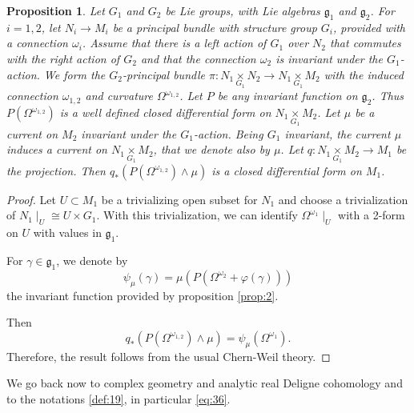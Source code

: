 \documentclass[10pt,twoside]{article}
\numberwithin{equation}{section}
\theoremstyle{plain}
\newtheorem{proposition}[equation]{Proposition}
\theoremstyle{definition}
\begin{document}
\begin{proposition} \label{prop:3}
  Let $G_{1}$ and $G_{2}$ be Lie groups, with Lie algebras
  $\mathfrak{g}_{1}$ and $\mathfrak{g}_{2}$. For $i=1,2$, let
  $N_{i}\longrightarrow 
  M_{i}$ be a principal bundle with structure group $G_{i}$, provided
  with a
  connection $\omega _{i}$. Assume that there is a left action of
  $G_{1}$ over $N_{2}$ that commutes with the right action of $G_{2}$
  and that the connection $\omega _{2}$ is invariant under the
  $G_{1}$-action. We form the $G_{2}$-principal bundle
  $\pi\colon N_{1}\underset{G_{1}}{\times} N_{2}\longrightarrow 
  N_{1}\underset{G_{1}}{\times} M_{2}$ with the induced connection
  $\omega _{1,2}$ and curvature $\Omega ^{\omega _{1,2}}$.  Let $P$ be
  any invariant function on $\mathfrak{g}_{2}$. Thus $P(\Omega
  ^{\omega _{1,2}})$ is a well defined closed differential form on
  $N_{1}\underset{G_{1}}{\times} M_{2}$. Let $\mu $ be a current on
  $M_{2}$ invariant under the $G_{1}$-action. Being $G_{1}$ invariant,
  the
  current $\mu $ 
  induces a current on $N_{1}\underset{G_{1}}{\times} M_{2}$, that we
  denote also by $\mu$. Let $q\colon N_{1}\underset{G_{1}}{\times} M_{2}
  \longrightarrow M_{1}$ be the projection. Then $q_{\ast}(P(\Omega
  ^{\omega _{1,2}})\land \mu)$ is a closed differential form on
  $M_{1}$.
\end{proposition}
\begin{proof}
  Let $U\subset M_{1}$ be a trivializing open subset for $N_{1}$ and
  choose a trivialization of $N_{1}\mid _{U}\cong U\times G_{1}$. With this
  trivialization, we can identify $\Omega ^{\omega _{1}}\mid _{U}$ with a
  2-form on $U$ with values in $\mathfrak{g}_{1}$. 

  For $\gamma \in \mathfrak{g}_{1}$, we denote by 
  \begin{displaymath}
    \psi _{\mu}(\gamma )=\mu (P(\Omega ^{\omega_{2}
}+\varphi(\gamma))) 
  \end{displaymath}
the invariant function provided by proposition \ref{prop:2}. 

Then 
\begin{displaymath}
  q_{\ast}(P(\Omega
  ^{\omega _{1,2}})\land \mu)= \psi _{\mu}(\Omega ^{\omega _{1}}).
\end{displaymath}
Therefore, the result follows from the usual Chern-Weil theory.
\end{proof}



We go back now to complex geometry and analytic real Deligne
cohomology and to the notations \ref{def:19}, in particular
\eqref{eq:36}.  
\end{document}
